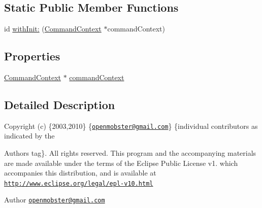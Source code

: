 \subsection*{\-Static \-Public \-Member \-Functions}
\begin{DoxyCompactItemize}
\item 
id \hyperlink{interface_execute_on_e_d_t_a28023d6426d9710d4d127cd38295fda5}{with\-Init\-:} (\hyperlink{interface_command_context}{\-Command\-Context} $\ast$command\-Context)
\end{DoxyCompactItemize}
\subsection*{\-Properties}
\begin{DoxyCompactItemize}
\item 
\hyperlink{interface_command_context}{\-Command\-Context} $\ast$ \hyperlink{interface_execute_on_e_d_t_aa9cc42fe3c21be740000149cff92c6e3}{command\-Context}
\end{DoxyCompactItemize}


\subsection{\-Detailed \-Description}
\-Copyright (c) \{2003,2010\} \{\href{mailto:openmobster@gmail.com}{\tt openmobster@gmail.\-com}\} \{individual contributors as indicated by the \begin{DoxyAuthor}{\-Authors}
tag\}. \-All rights reserved. \-This program and the accompanying materials are made available under the terms of the \-Eclipse \-Public \-License v1. which accompanies this distribution, and is available at \href{http://www.eclipse.org/legal/epl-v10.html}{\tt http\-://www.\-eclipse.\-org/legal/epl-\/v10.\-html}
\end{DoxyAuthor}
\begin{DoxyAuthor}{\-Author}
\href{mailto:openmobster@gmail.com}{\tt openmobster@gmail.\-com} 
\end{DoxyAuthor}


